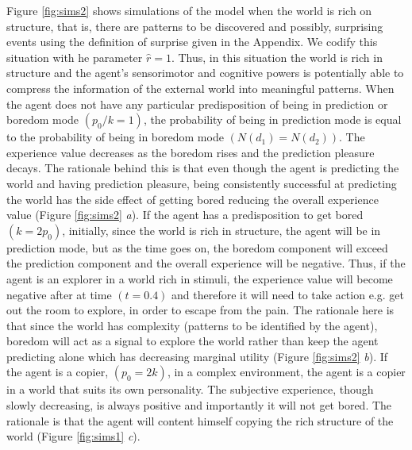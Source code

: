 \documentclass[11pt, onecolumn]{article}
\begin{document}
Figure \ref{fig:sims2} shows simulations of the model when the world is rich on structure, that is, there are patterns to be discovered and possibly, surprising events using the definition of surprise given in the Appendix. We codify this situation with he parameter $\hat{r} = 1$. Thus, in this situation the world is rich in structure and the agent's sensorimotor and cognitive powers is potentially  able to compress the information of the external world into meaningful patterns. 
When the agent does not have any particular predisposition of being in prediction or boredom mode $(p_0/k =1)$, the probability of being in prediction mode is equal to the probability of being in boredom mode $(N(d_1) = N(d_2))$. The experience value decreases as the boredom rises and the prediction pleasure decays. The rationale behind this is that even though the agent is predicting the world and having prediction pleasure, being consistently successful at predicting the world has the side effect of getting bored reducing the overall experience value (Figure \ref{fig:sims2} \emph{a}). %
If the agent has a predisposition to get bored $(k = 2p_0)$, initially, since the world is rich in structure, the agent will be in prediction mode, but as the time goes on, the boredom component will exceed the prediction component and the overall experience will be negative. Thus, if the agent is an explorer in a world rich in stimuli, the experience value will become negative after at time $(t = 0.4)$ and therefore it will need to take action e.g. get out the room to explore, in order to escape from the pain. The rationale here is that since the world has complexity (patterns to be identified by the agent), boredom will act as a signal to explore the world rather than keep the agent predicting alone which has decreasing marginal utility (Figure \ref{fig:sims2} \emph{b}). %
If the agent is a copier, $(p_0 = 2k)$, in a complex environment, the agent is a copier in a world that suits its own personality. The subjective experience, though slowly decreasing, is always positive and importantly it will not get bored. The rationale is that the agent will content himself copying the rich structure of the world (Figure \ref{fig:sims1} \emph{c}). %
\end{document}
